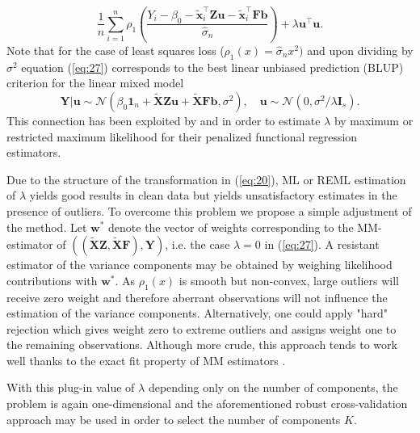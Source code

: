 \documentclass[11pt]{article}
\begin{document}
\begin{equation}
\label{eq:27}
\frac{1}{n} \sum_{i=1}^n \rho_1 \left( \frac{Y_i - \beta_0 - \mathbf{\widetilde{x}}_i^{\top} \mathbf{Z} \mathbf{u} -  \mathbf{\widetilde{x}}_i^{\top} \mathbf{F} \mathbf{b}  }{\widehat{\sigma}_n} \right) + \lambda \mathbf{u}^{\top} \mathbf{u}.
\end{equation}
Note that for the case of least squares loss ($\rho_{1}(x) = \widehat{\sigma}_n x^2)$ and upon dividing by $\sigma^2$ equation (\ref{eq:27}) corresponds to the best linear unbiased prediction (BLUP) criterion for the linear mixed model
\begin{equation}
\label{eq:28}
\mathbf{Y}|\mathbf{u} \sim \mathcal{N}\left( \beta_0 \mathbf{1}_n + \widetilde{\mathbf{X}}\mathbf{Z}\mathbf{u} + \widetilde{\mathbf{X}} \mathbf{F} \mathbf{b}, \sigma^2  \right), \quad \mathbf{u} \sim \mathcal{N}\left(0, \sigma^2/\lambda \mathbf{I}_s \right).
\end{equation}
This connection has been exploited by \cite{reiss2007functional} and \cite{goldsmith2011penalized} in order to estimate $\lambda$ by maximum or restricted maximum likelihood for their penalized functional regression estimators. 

Due to the structure of the transformation in (\ref{eq:20}), ML or REML estimation of $\lambda$ yields good results in clean data but yields unsatisfactory estimates in the presence of outliers. To overcome this problem we propose a simple adjustment of the method. Let $\mathbf{w}^{*}$ denote the vector of weights corresponding to the MM-estimator of $((\mathbf{\widetilde{X}}\mathbf{Z}, \mathbf{\widetilde{X}}\mathbf{F} ), \mathbf{Y})$, i.e. the case $\lambda = 0$ in (\ref{eq:27}). A resistant estimator of the variance components may be obtained by weighing likelihood contributions with $\mathbf{w}^{*}$. As $\rho_1(x)$ is smooth but non-convex, large outliers will receive zero weight and therefore aberrant observations will not influence the estimation of the variance components. Alternatively, one could apply "hard" rejection which gives weight zero to extreme outliers and assigns weight one to the remaining observations. Although more crude, this approach tends to work well thanks to the exact fit property of MM estimators \citep{maronna2006robust}. 

With this plug-in value of $\lambda$ depending only on the number of components, the problem is again one-dimensional and the aforementioned robust cross-validation approach may be used in order to select the number of components $K$. 
\end{document}
